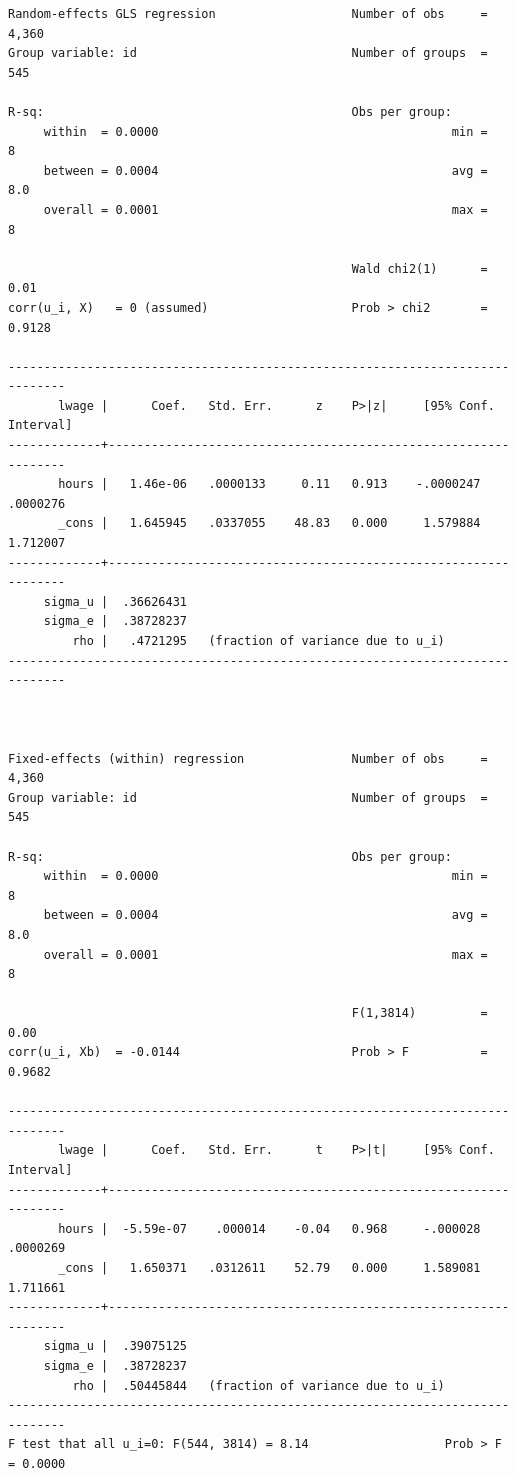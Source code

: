\documentclass[]{book}
\begin{document}
\begin{verbatim}
Random-effects GLS regression                   Number of obs     =      4,360
Group variable: id                              Number of groups  =        545

R-sq:                                           Obs per group:
     within  = 0.0000                                         min =          8
     between = 0.0004                                         avg =        8.0
     overall = 0.0001                                         max =          8

                                                Wald chi2(1)      =       0.01
corr(u_i, X)   = 0 (assumed)                    Prob > chi2       =     0.9128

------------------------------------------------------------------------------
       lwage |      Coef.   Std. Err.      z    P>|z|     [95% Conf. Interval]
-------------+----------------------------------------------------------------
       hours |   1.46e-06   .0000133     0.11   0.913    -.0000247    .0000276
       _cons |   1.645945   .0337055    48.83   0.000     1.579884    1.712007
-------------+----------------------------------------------------------------
     sigma_u |  .36626431
     sigma_e |  .38728237
         rho |   .4721295   (fraction of variance due to u_i)
------------------------------------------------------------------------------



Fixed-effects (within) regression               Number of obs     =      4,360
Group variable: id                              Number of groups  =        545

R-sq:                                           Obs per group:
     within  = 0.0000                                         min =          8
     between = 0.0004                                         avg =        8.0
     overall = 0.0001                                         max =          8

                                                F(1,3814)         =       0.00
corr(u_i, Xb)  = -0.0144                        Prob > F          =     0.9682

------------------------------------------------------------------------------
       lwage |      Coef.   Std. Err.      t    P>|t|     [95% Conf. Interval]
-------------+----------------------------------------------------------------
       hours |  -5.59e-07    .000014    -0.04   0.968     -.000028    .0000269
       _cons |   1.650371   .0312611    52.79   0.000     1.589081    1.711661
-------------+----------------------------------------------------------------
     sigma_u |  .39075125
     sigma_e |  .38728237
         rho |  .50445844   (fraction of variance due to u_i)
------------------------------------------------------------------------------
F test that all u_i=0: F(544, 3814) = 8.14                   Prob > F = 0.0000


\end{verbatim}
\end{document}
